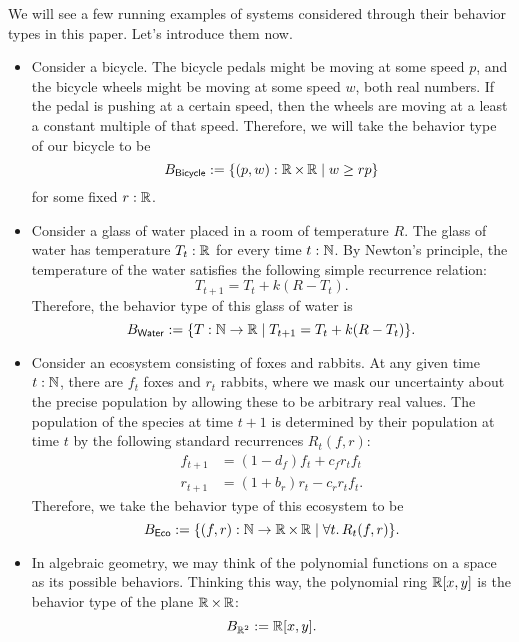 \begin{ex}
We will see a few running examples of systems considered through their behavior types in this paper. Let's introduce them now.

\begin{itemize}
    \item Consider a bicycle. The bicycle pedals might be moving at some speed $p$, and the bicycle wheels might be moving at some speed $w$, both real numbers. If the pedal is pushing at a certain speed, then the wheels are moving at a least a constant multiple of that speed. Therefore, we will take the behavior type of our bicycle to be
    $$B_{\mathsf{{Bicycle}}} := \{(p, w) : \operatorname{\mathbb{R}} \times \operatorname{\mathbb{R}} \mid w \geq rp \}$$
    for some fixed $r : \operatorname{\mathbb{R}}$.
    
    \item Consider a glass of water placed in a room of temperature $R$. The glass of water has temperature $T_t : \operatorname{\mathbb{R}}$ for every time $t : \operatorname{\mathbb{N}}$. By Newton's principle, the temperature of the water satisfies the following simple recurrence relation:
    $$T_{t + 1} = T_t + k(R - T_t).$$
    Therefore, the behavior type of this glass of water is
    $$B_{\mathsf{{Water}}} := \{ T : \operatorname{\mathbb{N}} \to \operatorname{\mathbb{R}} \mid T_{t + 1} = T_t + k(R - T_t)\}.$$
    
    \item Consider an ecosystem consisting of foxes and rabbits. At any given time $t : \operatorname{\mathbb{N}}$, there are $f_t$ foxes and $r_t$ rabbits, where we mask our uncertainty about the precise population by allowing these to be arbitrary real values. The population of the species at time $t + 1$ is determined by their population at time $t$ by the following standard recurrences $R_t(f, r)$:
    \begin{align*}
        f_{t + 1} &= (1 - d_f)f_t + c_f r_t f_t \\
        r_{t + 1} &= (1 + b_r)r_t - c_r r_t f_t.
    \end{align*}
    Therefore, we take the behavior type of this ecosystem to be
    $$B_{\mathsf{{Eco}}} := \{(f, r) : \operatorname{\mathbb{N}} \to \operatorname{\mathbb{R}} \times \operatorname{\mathbb{R}} \mid \forall t.\, R_t(f, r)\}.$$
    
    \item In algebraic geometry, we may think of the polynomial functions on a space as its possible behaviors. Thinking this way, the polynomial ring $\operatorname{\mathbb{R}}[x, y]$ is the behavior type of the plane $\operatorname{\mathbb{R}} \times \operatorname{\mathbb{R}}$:
    $$B_{\operatorname{\mathbb{R}}^2} := \operatorname{\mathbb{R}}[x, y].$$
\end{itemize}
\end{ex}

